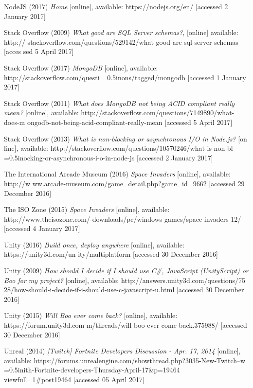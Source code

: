 \documentclass[12pt]{article}
\begin{document}
NodeJS (2017) \textit{Home} [online], available: https://nodejs.org/en/ [accessed 2 January 
\hangindent=0.5in 2017]

Stack Overflow (2009) \textit{What good are SQL Server schemas?}, [online] available: http://
\hangindent=0.5in stackoverflow.com/questions/529142/what-good-are-sql-server-schemas [acces
\hangindent=0.5in sed 5 April 2017]

Stack Overflow (2017) \textit{MongoDB} [online], available:
http://stackoverflow.com/questi
\hangindent=0.5inons/tagged/mongodb [accessed 1 January 2017]

Stack Overflow (2011) \textit{What does MongoDB not being ACID compliant really mean?} \hangindent=0.5in[online], available: http://stackoverflow.com/questions/7149890/what-does-m
\hangindent=0.5in ongodb-not-being-acid-compliant-really-mean [accessed 5 April 2017]

Stack Overflow (2013) \textit{What is non-blocking or asynchronous I/O in Node.js?} [on
\hangindent=0.5in line], available: http://stackoverflow.com/questions/10570246/what-is-non-bl 
\hangindent=0.5inocking-or-asynchronous-i-o-in-node-js [accessed 2 January 2017]

The International Arcade Museum (2016) \textit{Space Invaders} [online], available: http://w
\hangindent=0.5in ww.arcade-museum.com/game{\_}detail.php?game{\_}id=9662 [accessed 29 December 2016]

The ISO Zone (2015) \textit{Space Invaders} [online], available:
http://www.theisozone.com/
\hangindent=0.5in downloads/pc/windows-games/space-invaders-12/
[accessed 4 January 2017]

Unity (2016) \textit{Build once, deploy anywhere} [online], available: https://unity3d.com/un
\hangindent=0.5in ity/multiplatform [accessed 30 December 2016]

Unity (2009) \textit{How should I decide if I should use C{\#}, JavaScript (UnityScript) or 
\hangindent=0.5in Boo for my project?} [online], available: http://answers.unity3d.com/questions/75
\hangindent=0.5in 28/how-should-i-decide-if-i-should-use-c-javascript-u.html [accessed 30 December 2016]

Unity (2015) \textit{Will Boo ever come back?} [online], available:
https://forum.unity3d.com
\hangindent=0.5in m/threads/will-boo-ever-come-back.375988/ [accessed 30
December 2016]

Unreal (2014) \textit{[Twitch] Fortnite Developers Discussion - Apr. 17, 2014} [online], \hangindent=0.5in available: https://forums.unrealengine.com/showthread.php?3035-New-Twitch--w
\hangindent=0.5inith-Fortnite-developers-Thursday-April-17{\&}p=19464
\hangindent=0.5in{\&}viewfull=1{\#}post19464 [accessed 05 April 2017]
\end{document}
